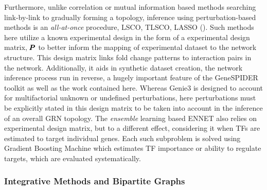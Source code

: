 Furthermore, unlike correlation or mutual information based methods searching link-by-link to gradually forming a topology, inference using perturbation-based methods is an {\it all-at-once} procedure, \ie LSCO, TLSCO, LASSO (). Such methods here utilize a known experimental design in the form of a experimental design matrix, \ie ${\pmb{P}}$ to better inform the mapping of experimental dataset to the network structure. This design matrix links fold change patterns to interaction pairs in the network. Additionally, it aids in synthetic dataset creation, the network inference process run in reverse, a hugely important feature of the GeneSPIDER toolkit as well as the work contained here. Whereas Genie3 is designed to account for multifactorial unknown or undefined perturbations, here perturbations must be explicitly stated in this design matrix to be taken into account in the inference of an overall GRN topology. 
The \emph{ensemble} learning based ENNET \citep{slawek2013ennet} also relies on experimental design matrix, but to a different effect, considering it when TFs are estimated to target individual genes. Each such subproblem is solved using Gradient Boosting Machine which estimates TF importance or ability to regulate targets, which are evaluated systematically.

\subsubsection{Integrative Methods and Bipartite Graphs}
\label{sec:bipart}

